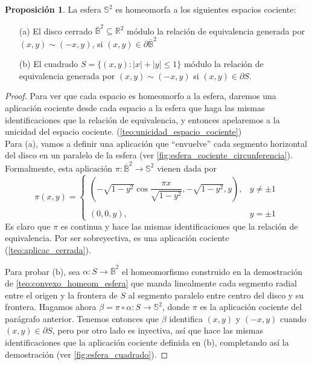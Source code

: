 \documentclass[10pt]{report}
\theoremstyle{definition}
\newtheorem{prop}[defin]{Proposición}
\begin{document}
\begin{prop}%
\label{prop:Esfera como cociente de disco y cuadrado}
La esfera $\mathbb{S}^2$ es homeomorfa a los siguientes espacios cociente: 
\begin{itemize}
\item[(a)] El disco cerrado $\overline{\mathbb{B}}^2\subseteq \mathbb{R}^2$ módulo la relación de equivalencia generada por $(x,y)\sim (-x,y)$, si $(x,y)\in \partial \overline{\mathbb{B}}^2$
\item[(b)] El cuadrado $S=\{(x,y):|x|+|y|\leq 1\}$ módulo la relación de equivalencia generada por $(x,y)\sim(-x,y)$ si $(x,y)\in \partial S$.
\end{itemize}
\end{prop}
\begin{proof}
Para ver que cada espacio es homeomorfo a la esfera, daremos una aplicación cociente desde cada espacio a la esfera que haga las mismas identificaciones que la relación de equivalencia, y entonces apelaremos a la unicidad del espacio cociente. (\autoref{teo:unicidad_espacio_cociente})\\
Para (a), vamos a definir una aplicación que ``envuelve'' cada segmento horizontal del disco en un paralelo de la esfera (ver \autoref{fig:esfera_cociente_circunferencia}).
Formalmente, esta aplicación $\pi:\overline{\mathbb{B}}^2\to \mathbb{S}^2$ vienen dada por 
$$\pi(x,y)=\left\{\begin{array}{lc}
			(-\sqrt{1-y^2} \cos\dfrac{\pi x}{\sqrt{1-y^2}}, -\sqrt{1-y^2}, y), & y\neq \pm 1 \\
			\\(0,0,y), & y=\pm1 

\end{array}
\right.$$
Es claro que $\pi$ es continua y hace las mismas identificaciones que la relación de equivalencia. Por ser sobreyectiva, es una aplicación cociente (\autoref{teo:aplicac_cerrada}).

Para probar (b), sea $\alpha:S\to \overline{\mathbb{B}}^2$ el homeomorfismo construido en la demostración de \autoref{teo:convexo_homeom_esfera} que manda linealmente cada segmento radial entre el origen y la frontera de $S$ al segmento paralelo entre centro del disco y su frontera. Hagamos ahora $\beta=\pi \circ \alpha : S \to \mathbb{S}^2$, donde $\pi$ es la aplicación cociente del parágrafo anterior. Tenemos entonces que $\beta$ identifica $(x,y)$ y $(-x,y)$ cuando $(x,y)\in \partial S$, pero por otro lado es inyectiva, así que hace las mismas identificaciones que la aplicación cociente definida en (b), completando así la demostración (ver \autoref{fig:esfera_cuadrado}). 
\end{proof}
\end{document}
